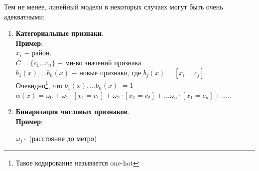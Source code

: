         Тем не менее, линейный модели в некоторых случаях могут быть очень адекватными:
        \begin{enumerate}
            \item \textbf{Категориальные признаки}.\\
                \textbf{Пример}:\\

                $x_i$ $-$ район.\\
                $C = \{c_1 ... c_n \}$ $-$ мн-во значений признака.\\

                
                $b_1(x), ... b_n(x) $ $-$ новые признаки, где $b_j(x) = [x_i = c_j]$\\
                Очевидно\footnote{Такое кодирование называется one-hot}, что $b_1(x), ... b_n(x) $ $= 1$\\

                $\alpha(x) = \omega_0 + \omega_1 \cdot [x_1 = c_1] + \omega_2 \cdot [x_1 = c_2] + ... \omega_n \cdot [x_1 = c_n] + .....$
                
            \newpage
            \item \textbf{Бинаризация числовых признаков}.\\
                \textbf{Пример}:
                

                \begin{center}
                    $\omega_j \cdot$ (расстояние до метро)
                \end{center}
    


\end{enumerate}
